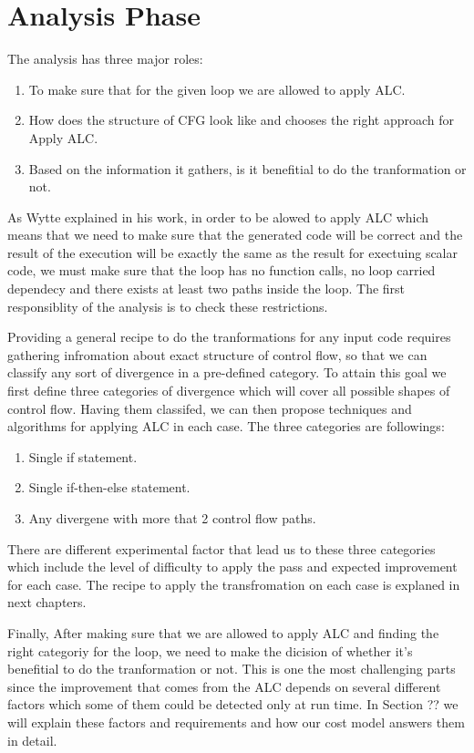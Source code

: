 \documentclass[\main/thesis.tex]{subfiles}
\begin{document}
\section{Analysis Phase}

The analysis has three major roles:
\begin{enumerate}
    \item To make sure that for the given loop we are allowed to apply ALC.
    \item How does the structure of CFG look like and chooses the right approach for Apply ALC.
    \item Based on the information it gathers, is it benefitial to do the tranformation or not.
\end{enumerate}

As Wytte explained in his work, in order to be alowed to apply ALC which means that we need to make sure that the generated code will be correct and the result of the execution will be exactly the same as the result for exectuing scalar code, we must make sure that the loop has no function calls, no loop carried dependecy and there exists at least two paths inside the loop. The first responsiblity of the analysis is to check these restrictions.

Providing a general recipe to do the tranformations for any input code requires gathering infromation about exact structure of control flow, so that we can classify any sort of divergence in a pre-defined category. To attain this goal we first define three categories of divergence
which will cover all possible shapes of control flow. Having them classifed, we can then propose techniques and algorithms for applying ALC in each case. The three categories are followings:

\begin{enumerate}
    \item Single if statement.
    \item Single if-then-else statement.
    \item Any divergene with more that 2 control flow paths.
\end{enumerate}

There are different experimental factor that lead us to these three categories which include the level of difficulty to apply the pass and expected improvement for each case. The recipe to apply the transfromation on each case is explaned in next chapters.

Finally, After making sure that we are allowed to apply ALC and finding the right categoriy for the loop, we need to make the dicision of whether it's benefitial to do the tranformation or not. This is one the most challenging parts since the improvement that comes from the ALC depends on several different factors which some of them could be detected only at run time. In Section ?? we will explain these factors and requirements and how our cost model answers them in detail.   
\end{document}
